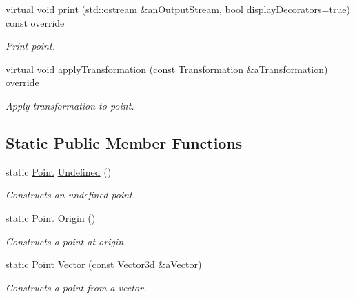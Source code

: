 \begin{DoxyCompactItemize}
virtual void \hyperlink{classostk_1_1math_1_1geom_1_1d3_1_1objects_1_1_point_a9aa69f544cb1b2b521126c0cca39c951}{print} (std\+::ostream \&an\+Output\+Stream, bool display\+Decorators=true) const override
\begin{DoxyCompactList}\small\item\em Print point. \end{DoxyCompactList}\item 
virtual void \hyperlink{classostk_1_1math_1_1geom_1_1d3_1_1objects_1_1_point_a0b79a5726ac04f814b8a5b737daf0028}{apply\+Transformation} (const \hyperlink{classostk_1_1math_1_1geom_1_1d3_1_1_transformation}{Transformation} \&a\+Transformation) override
\begin{DoxyCompactList}\small\item\em Apply transformation to point. \end{DoxyCompactList}\end{DoxyCompactItemize}
\subsection*{Static Public Member Functions}
\begin{DoxyCompactItemize}
\item 
static \hyperlink{classostk_1_1math_1_1geom_1_1d3_1_1objects_1_1_point}{Point} \hyperlink{classostk_1_1math_1_1geom_1_1d3_1_1objects_1_1_point_ab0de3c7a7d547bbf169d0beb62f9ea25}{Undefined} ()
\begin{DoxyCompactList}\small\item\em Constructs an undefined point. \end{DoxyCompactList}\item 
static \hyperlink{classostk_1_1math_1_1geom_1_1d3_1_1objects_1_1_point}{Point} \hyperlink{classostk_1_1math_1_1geom_1_1d3_1_1objects_1_1_point_a079c199f08b015d456d02728a71b534c}{Origin} ()
\begin{DoxyCompactList}\small\item\em Constructs a point at origin. \end{DoxyCompactList}\item 
static \hyperlink{classostk_1_1math_1_1geom_1_1d3_1_1objects_1_1_point}{Point} \hyperlink{classostk_1_1math_1_1geom_1_1d3_1_1objects_1_1_point_a74796fec8c39081bc8d766d70e44651d}{Vector} (const Vector3d \&a\+Vector)
\begin{DoxyCompactList}\small\item\em Constructs a point from a vector. \end{DoxyCompactList}\end{DoxyCompactItemize}



